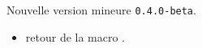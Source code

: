 Nouvelle version mineure \verb+0.4.0-beta+.

\begin{itemize}[itemsep=.5em]
    \item {}
          retour de la macro .


\end{itemize}

\separation

